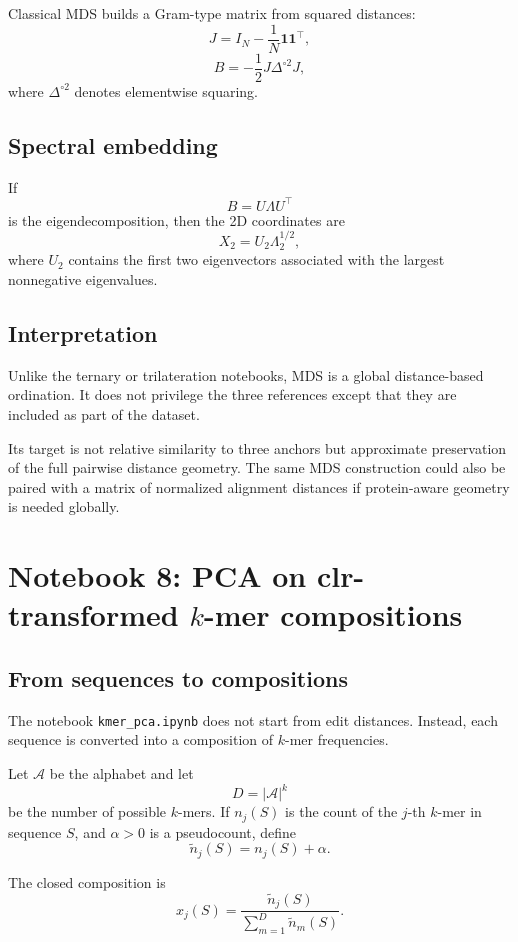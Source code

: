\documentclass[11pt,a4paper]{article}
\begin{document}
Classical MDS builds a Gram-type matrix from squared distances:
\[
J=I_N-\frac{1}{N}\bm{1}\bm{1}^\top,
\]
\[
B=-\frac12 J\Delta^{\circ 2}J,
\]
where $\Delta^{\circ 2}$ denotes elementwise squaring.

\subsection{Spectral embedding}

If
\[
B=U\Lambda U^\top
\]
is the eigendecomposition, then the 2D coordinates are
\[
X_2=U_2\Lambda_2^{1/2},
\]
where $U_2$ contains the first two eigenvectors associated with the largest nonnegative eigenvalues.

\subsection{Interpretation}

Unlike the ternary or trilateration notebooks, MDS is a global distance-based ordination. It does not privilege the three references except that they are included as part of the dataset.

Its target is not relative similarity to three anchors but approximate preservation of the full pairwise distance geometry. The same MDS construction could also be paired with a matrix of normalized alignment distances if protein-aware geometry is needed globally.

\section{Notebook 8: PCA on clr-transformed $k$-mer compositions}

\subsection{From sequences to compositions}

The notebook \texttt{kmer\_pca.ipynb} does not start from edit distances. Instead, each sequence is converted into a composition of $k$-mer frequencies.

Let $\mathcal{A}$ be the alphabet and let
\[
D=|\mathcal{A}|^k
\]
be the number of possible $k$-mers. If $n_j(S)$ is the count of the $j$-th $k$-mer in sequence $S$, and $\alpha>0$ is a pseudocount, define
\[
\tilde{n}_j(S)=n_j(S)+\alpha.
\]

The closed composition is
\[
x_j(S)=\frac{\tilde{n}_j(S)}{\sum_{m=1}^{D}\tilde{n}_m(S)}.
\]
\end{document}
